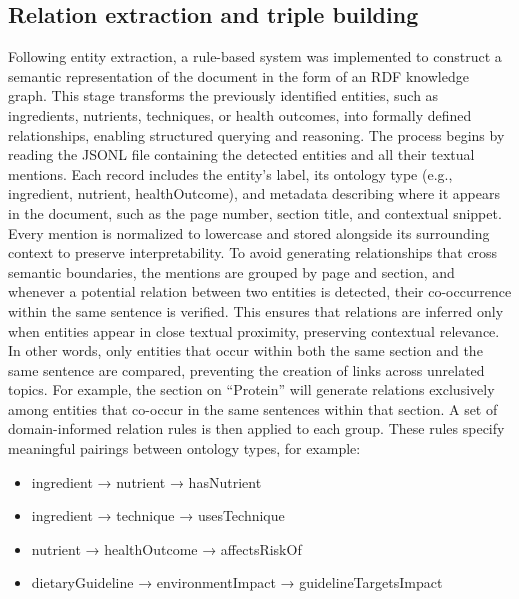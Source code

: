 \subsection{Relation extraction and triple building}
Following entity extraction, a rule-based system was implemented to construct a semantic representation of the document in the form of an RDF knowledge graph. This stage transforms the previously identified entities, such as ingredients, nutrients, techniques, or health outcomes, into formally defined relationships, enabling structured querying and reasoning.
The process begins by reading the JSONL file containing the detected entities and all their textual mentions. Each record includes the entity’s label, its ontology type (e.g., ingredient, nutrient, healthOutcome), and metadata describing where it appears in the document, such as the page number, section title, and contextual snippet. Every mention is normalized to lowercase and stored alongside its surrounding context to preserve interpretability. To avoid generating relationships that cross semantic boundaries, the mentions are grouped by page and section, and whenever a potential relation between two entities is detected, their co-occurrence within the same sentence is verified. This ensures that relations are inferred only when entities appear in close textual proximity, preserving contextual relevance. In other words, only entities that occur within both the same section and the same sentence are compared, preventing the creation of links across unrelated topics. For example, the section on “Protein” will generate relations exclusively among entities that co-occur in the same sentences within that section.
A set of domain-informed relation rules is then applied to each group. These rules specify meaningful pairings between
ontology types, for example:
\begin{itemize}
\item ingredient → nutrient → hasNutrient
\item ingredient → technique → usesTechnique
\item nutrient → healthOutcome → affectsRiskOf
\item dietaryGuideline → environmentImpact → guidelineTargetsImpact
\end{itemize}


